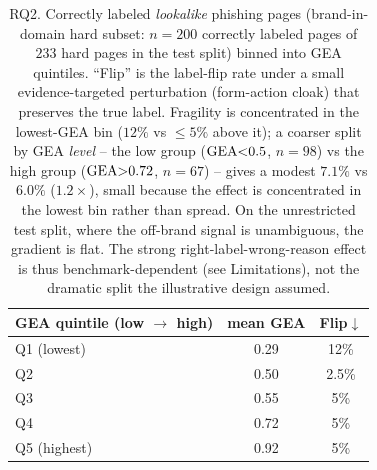 \begin{table}[!h]
\caption{RQ2. Correctly labeled \emph{lookalike} phishing pages (brand-in-domain hard
subset: $n{=}200$ correctly labeled pages of $233$ hard pages in the test split) binned into
GEA quintiles. ``Flip'' is the label-flip rate under a
small evidence-targeted perturbation (form-action cloak) that preserves the true label.
Fragility is concentrated in the lowest-GEA bin ($12\%$ vs $\le5\%$ above it); a coarser
split by GEA \emph{level} -- the low group ($\mathrm{GEA}{<}0.5$, $n{=}98$) vs the high group
($\mathrm{GEA}{>}0.72$, $n{=}67$) -- gives a modest $7.1\%$ vs $6.0\%$ ($1.2\times$), small
because the effect is concentrated in the lowest bin rather than spread. On the
unrestricted test split, where the off-brand signal is unambiguous, the gradient is
flat. The strong right-label-wrong-reason effect is thus benchmark-dependent (see
Limitations), not the dramatic split the illustrative design assumed.}
\label{tab:rlwr}
\footnotesize
\setlength{\tabcolsep}{4.0pt}
\begin{tabular*}{\columnwidth}{@{\extracolsep{\fill}}lcc@{}}
\toprule
GEA quintile (low $\to$ high) & mean GEA & Flip$\downarrow$ \\
\midrule
Q1 (lowest)  & 0.29 & 12\% \\
Q2           & 0.50 & 2.5\% \\
Q3           & 0.55 & \phantom{0}5\% \\
Q4           & 0.72 & \phantom{0}5\% \\
Q5 (highest) & 0.92 & \phantom{0}5\% \\
\bottomrule
\end{tabular*}
\end{table}
